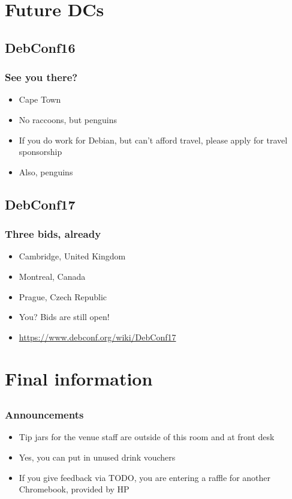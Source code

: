 \documentclass[t]{beamer}
\begin{document}
\section{Future DCs}

\subsection{DebConf16}

\begin{frame}
	\frametitle{See you there?}
	\begin{itemize}
		\item Cape Town
		\item No raccoons, but penguins
		\item If you do work for Debian, but can't afford travel, please apply for travel sponsorship
		\item Also, penguins
	\end{itemize}
\end{frame}

\subsection{DebConf17}

\begin{frame}
	\frametitle{Three bids, already}
	\begin{itemize}
		\item Cambridge, United Kingdom
		\item Montreal, Canada
		\item Prague, Czech Republic
		\item You? Bids are still open!
		\item \url{https://www.debconf.org/wiki/DebConf17}
	\end{itemize}
\end{frame}


\section{Final information}

\subsection{}

\begin{frame}
	\frametitle{Announcements}
	\begin{itemize}
		\item Tip jars for the venue staff are outside of this room and at front desk
		\item Yes, you can put in unused drink vouchers %
		\item If you give feedback via TODO, you are entering a raffle for another Chromebook, provided by HP
	\end{itemize}
\end{frame}
\end{document}
